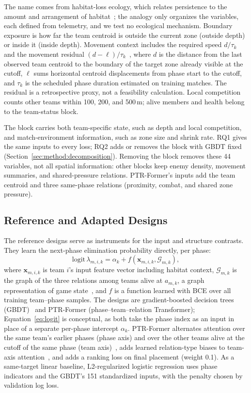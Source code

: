\documentclass[sigconf,anonymous]{acmart}
\begin{document}
The name comes from habitat-loss ecology, which relates persistence to the amount and arrangement of habitat~\cite{Fahrig03}; the analogy only organizes the variables, each defined from telemetry, and we test no ecological mechanism. Boundary exposure is how far the team centroid is outside the current zone (outside depth) or inside it (inside depth). Movement context includes the required speed $d/\tau_k$ and the movement residual $(d-\ell)/\tau_k$~\cite{Nathan08}, where $d$ is the distance from the last observed team centroid to the boundary of the target zone already visible at the cutoff, $\ell$ sums horizontal centroid displacements from phase start to the cutoff, and $\tau_k$ is the scheduled phase duration estimated on training matches. The residual is a retrospective proxy, not a feasibility calculation. Local competition counts other teams within 100, 200, and 500\,m; alive members and health belong to the team-status block.

The block carries both team-specific state, such as depth and local competition, and match-environment information, such as zone size and shrink rate. RQ1 gives the same inputs to every loss; RQ2 adds or removes the block with GBDT fixed (Section~\ref{sec:method:decomposition}). Removing the block removes these 44 variables, not all spatial information: other blocks keep enemy density, movement summaries, and shared-pressure relations. PTR-Former's inputs add the team centroid and three same-phase relations (proximity, combat, and shared zone pressure).


\subsection{Reference and Adapted Designs}
\label{sec:method:rq2}
The reference designs serve as instruments for the input and structure contrasts. They learn the next-phase elimination probability directly, per phase:
\begin{equation}
\mathrm{logit}\,\lambda_{m,i,k}=\alpha_k+f(\mathbf{x}_{m,i,k},\mathcal{G}_{m,k}),
\label{eq:logit}
\end{equation}
where $\mathbf{x}_{m,i,k}$ is team $i$'s input feature vector including habitat context, $\mathcal{G}_{m,k}$ is the graph of the three relations among teams alive at $a_{m,k}$, a graph representation of game state~\cite{Xenopoulos21}, and $f$ is a function learned with BCE over all training team--phase samples. The designs are gradient-boosted decision trees (GBDT)~\cite{Friedman01} and PTR-Former (phase--team--relation Transformer); Equation~\eqref{eq:logit} is conceptual, as both take the phase index as an input in place of a separate per-phase intercept $\alpha_k$. PTR-Former alternates attention over the same team's earlier phases (phase axis) and over the other teams alive at the cutoff of the same phase (team axis)~\cite{Vaswani17,Ngiam22}, adds learned relation-type biases to team-axis attention~\cite{Ying21}, and adds a ranking loss on final placement (weight 0.1). As a same-target linear baseline, L2-regularized logistic regression uses phase indicators and the GBDT's 151 standardized inputs, with the penalty chosen by validation log loss.
\end{document}
